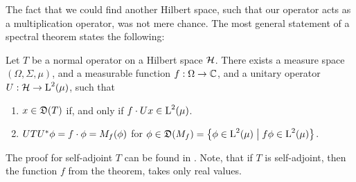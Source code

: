 The fact that we could find another Hilbert space, such that our operator
acts as a multiplication operator, was not mere chance. The most general 
statement of a spectral theorem states the following:

\begin{thrm}

Let $T$ be a normal operator on a Hilbert space $\mathcal{H}$. There exists
a measure space $(\Omega, \Sigma, \mu)$, and a measurable function 
$f: \Omega \to \mathbb{C}$, and a unitary operator $U: \mathcal{H} \to \text{L}^2(\mu)$,
such that
\begin{enumerate}[\normalfont (a)]
 \item $x \in \mathfrak{D}(T)$ if, and only if $f \cdot Ux \in \text{L}^2(\mu)$.
 \item $UTU^{*} \phi = f \cdot \phi = M_f(\phi)$ for 
 $\phi \in \mathfrak{D}(M_f) 
 = \left\lbrace \phi \in \text{L}^2(\mu) \bigm | f\phi \in \text{L}^2(\mu) \right\rbrace$.
\end{enumerate}
\end{thrm}
The proof for self-adjoint $T$ can be found in \cite[Ch. VII.4]{WernerFunkAna}.
Note, that if $T$ is self-adjoint, then the function $f$ from the theorem, 
takes only real values.






























